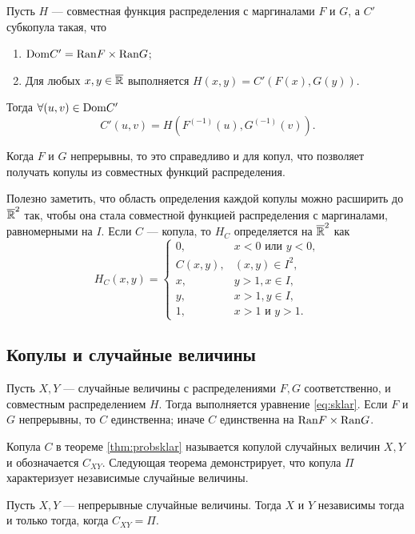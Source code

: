 \begin{theorem}
	Пусть $H$ --- совместная функция распределения с маргиналами $F$ и $G$, а $C'$ субкопула такая, что
	\begin{enumerate}
	\item $\mathrm{Dom}{C'} = \mathrm{Ran}{F} \times \mathrm{Ran}{G}$;
	\item Для любых $x, y \in \overline{\mathbb{R}}$ выполняется $H(x, y) = C'(F(x), G(y))$.
	\end{enumerate}
Тогда $\forall (u, v) \in \mathrm{Dom}{C'}$
\[
C'(u, v) = H(F^{(-1)}(u), G^{(-1)}(v)).
\]
\end{theorem}

Когда $F$ и $G$ непрерывны, то это справедливо и для копул, что позволяет получать копулы из совместных функций распределения.

Полезно заметить, что область определения каждой копулы можно расширить до $\overline{\mathbb{R}}^2$ так, чтобы она стала совместной функцией распределения с маргиналами, равномерными на $I$. Если $C$ --- копула, то $H_C$ определяется на $\overline{\mathbb{R}}^2$ как
\[
H_C(x, y) =
\begin{cases}
0, &x < 0 \text{ или } y < 0, \\
C(x, y), &(x, y) \in I^2, \\
x, &y > 1, x \in I, \\
y, &x > 1, y \in I, \\
1, &x > 1 \text{ и } y > 1.
\end{cases}
\]

\subsection*{Копулы и случайные величины}

\begin{theorem}\label{thm:probsklar}
	Пусть $X, Y$ --- случайные величины с распределениями $F, G$ соответственно, и совместным распределением $H$. Тогда выполняется уравнение \eqref{eq:sklar}.
Если $F$ и $G$ непрерывны, то $C$ единственна; иначе $C$ единственна на $\mathrm{Ran}{F} \times \mathrm{Ran}{G}$.
\end{theorem}

Копула $C$ в теореме \ref{thm:probsklar} называется копулой случайных величин $X, Y$ и обозначается $C_{XY}$. Следующая теорема демонстрирует, что копула $\Pi$ характеризует независимые случайные величины.

\begin{theorem}
	Пусть $X, Y$ --- непрерывные случайные величины. Тогда $X$ и $Y$ независимы тогда и только тогда, когда $C_{XY} = \Pi$.
\end{theorem}

